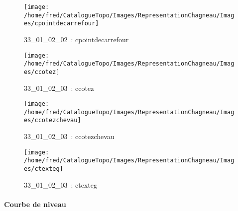 \documentclass[12pt,titlepage]{book}
\begin{document}
\begin{figure}[h!]
\begin{minipage}[t]{3cm}
    \begin{center}
      \texttt{[image: /home/fred/CatalogueTopo/Images/RepresentationChagneau/Images/cpointdecarrefour]}
      \caption[~33\_01\_02\_02]{\small{33\_01\_02\_02~:} \tiny{cpointdecarrefour}}\label{cpointdecarrefour}
    \end{center}
  \end{minipage}
  \begin{minipage}[t]{3cm}
    \begin{center}
      \texttt{[image: /home/fred/CatalogueTopo/Images/RepresentationChagneau/Images/ccotez]}
      \caption[~33\_01\_02\_03]{\small{33\_01\_02\_03~:} \tiny{ccotez}}\label{ccotez}
    \end{center}
  \end{minipage}
  \begin{minipage}[t]{3cm}
    \begin{center}
      \texttt{[image: /home/fred/CatalogueTopo/Images/RepresentationChagneau/Images/ccotezchevau]}
      \caption[~33\_01\_02\_03]{\small{33\_01\_02\_03~:} \tiny{ccotezchevau}}\label{ccotezchevau}
    \end{center}
  \end{minipage}
  \begin{minipage}[t]{3cm}
    \begin{center}
      \texttt{[image: /home/fred/CatalogueTopo/Images/RepresentationChagneau/Images/ctexteg]}
      \caption[~33\_01\_02\_03]{\small{33\_01\_02\_03~:} \tiny{ctexteg}}\label{ctexteg}
    \end{center}
  \end{minipage}
\end{figure}


\paragraph{Courbe de niveau}
\noindent
\vspace{\baselineskip}
\end{document}
